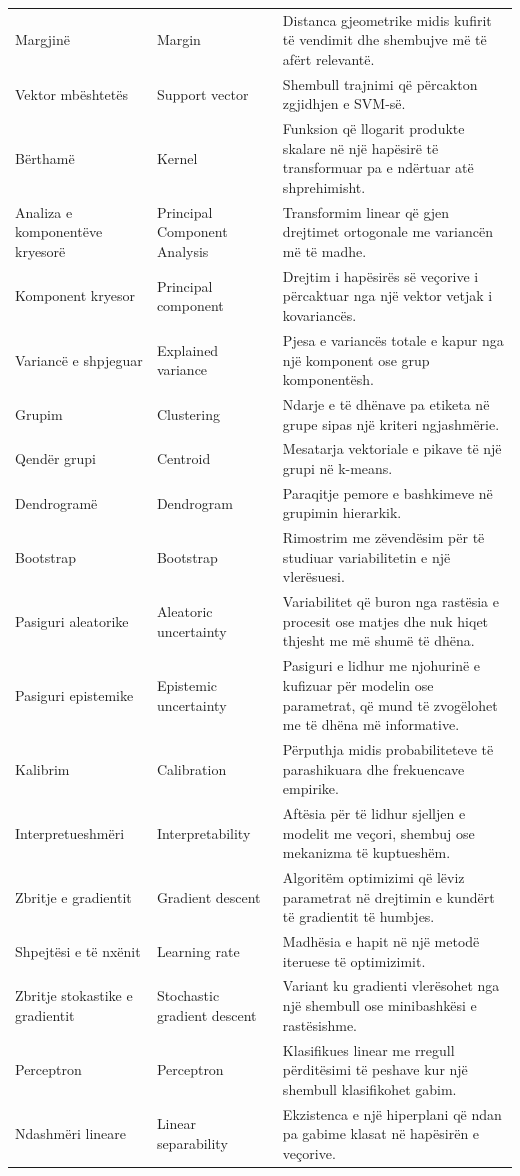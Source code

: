 \documentclass[12pt,a4paper,oneside]{book}
\begin{document}
\begin{longtable}{p{}p{}p{}}
Margjinë & Margin & Distanca gjeometrike midis kufirit të vendimit dhe shembujve më të afërt relevantë.\\
Vektor mbështetës & Support vector & Shembull trajnimi që përcakton zgjidhjen e SVM-së.\\
Bërthamë & Kernel & Funksion që llogarit produkte skalare në një hapësirë të transformuar pa e ndërtuar atë shprehimisht.\\
Analiza e komponentëve kryesorë & Principal Component Analysis & Transformim linear që gjen drejtimet ortogonale me variancën më të madhe.\\
Komponent kryesor & Principal component & Drejtim i hapësirës së veçorive i përcaktuar nga një vektor vetjak i kovariancës.\\
Variancë e shpjeguar & Explained variance & Pjesa e variancës totale e kapur nga një komponent ose grup komponentësh.\\
Grupim & Clustering & Ndarje e të dhënave pa etiketa në grupe sipas një kriteri ngjashmërie.\\
Qendër grupi & Centroid & Mesatarja vektoriale e pikave të një grupi në k-means.\\
Dendrogramë & Dendrogram & Paraqitje pemore e bashkimeve në grupimin hierarkik.\\
Bootstrap & Bootstrap & Rimostrim me zëvendësim për të studiuar variabilitetin e një vlerësuesi.\\
Pasiguri aleatorike & Aleatoric uncertainty & Variabilitet që buron nga rastësia e procesit ose matjes dhe nuk hiqet thjesht me më shumë të dhëna.\\
Pasiguri epistemike & Epistemic uncertainty & Pasiguri e lidhur me njohurinë e kufizuar për modelin ose parametrat, që mund të zvogëlohet me të dhëna më informative.\\
Kalibrim & Calibration & Përputhja midis probabiliteteve të parashikuara dhe frekuencave empirike.\\
Interpretueshmëri & Interpretability & Aftësia për të lidhur sjelljen e modelit me veçori, shembuj ose mekanizma të kuptueshëm.\\
Zbritje e gradientit & Gradient descent & Algoritëm optimizimi që lëviz parametrat në drejtimin e kundërt të gradientit të humbjes.\\
Shpejtësi e të nxënit & Learning rate & Madhësia e hapit në një metodë iteruese të optimizimit.\\
Zbritje stokastike e gradientit & Stochastic gradient descent & Variant ku gradienti vlerësohet nga një shembull ose minibashkësi e rastësishme.\\
Perceptron & Perceptron & Klasifikues linear me rregull përditësimi të peshave kur një shembull klasifikohet gabim.\\
Ndashmëri lineare & Linear separability & Ekzistenca e një hiperplani që ndan pa gabime klasat në hapësirën e veçorive.\\
\bottomrule
\end{longtable}
\normalsize
\end{document}
